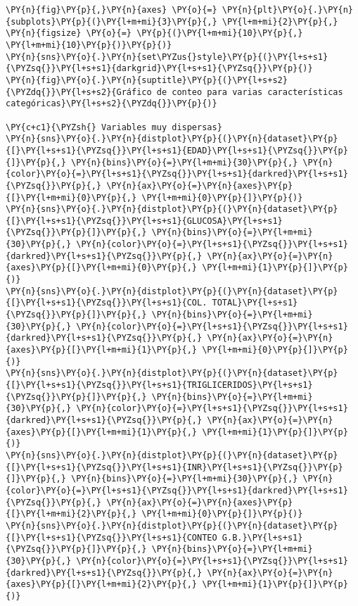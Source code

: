     \begin{tcolorbox}[breakable, size=fbox, boxrule=1pt, pad at break*=1mm,colback=cellbackground, colframe=cellborder]
\begin{Verbatim}[commandchars=\\\{\}]
\PY{n}{fig}\PY{p}{,}\PY{n}{axes} \PY{o}{=} \PY{n}{plt}\PY{o}{.}\PY{n}{subplots}\PY{p}{(}\PY{l+m+mi}{3}\PY{p}{,} \PY{l+m+mi}{2}\PY{p}{,} \PY{n}{figsize} \PY{o}{=} \PY{p}{(}\PY{l+m+mi}{10}\PY{p}{,} \PY{l+m+mi}{10}\PY{p}{)}\PY{p}{)}
\PY{n}{sns}\PY{o}{.}\PY{n}{set\PYZus{}style}\PY{p}{(}\PY{l+s+s1}{\PYZsq{}}\PY{l+s+s1}{darkgrid}\PY{l+s+s1}{\PYZsq{}}\PY{p}{)}
\PY{n}{fig}\PY{o}{.}\PY{n}{suptitle}\PY{p}{(}\PY{l+s+s2}{\PYZdq{}}\PY{l+s+s2}{Gráfico de conteo para varias características categóricas}\PY{l+s+s2}{\PYZdq{}}\PY{p}{)}

\PY{c+c1}{\PYZsh{} Variables muy dispersas}
\PY{n}{sns}\PY{o}{.}\PY{n}{distplot}\PY{p}{(}\PY{n}{dataset}\PY{p}{[}\PY{l+s+s1}{\PYZsq{}}\PY{l+s+s1}{EDAD}\PY{l+s+s1}{\PYZsq{}}\PY{p}{]}\PY{p}{,} \PY{n}{bins}\PY{o}{=}\PY{l+m+mi}{30}\PY{p}{,} \PY{n}{color}\PY{o}{=}\PY{l+s+s1}{\PYZsq{}}\PY{l+s+s1}{darkred}\PY{l+s+s1}{\PYZsq{}}\PY{p}{,} \PY{n}{ax}\PY{o}{=}\PY{n}{axes}\PY{p}{[}\PY{l+m+mi}{0}\PY{p}{,} \PY{l+m+mi}{0}\PY{p}{]}\PY{p}{)}
\PY{n}{sns}\PY{o}{.}\PY{n}{distplot}\PY{p}{(}\PY{n}{dataset}\PY{p}{[}\PY{l+s+s1}{\PYZsq{}}\PY{l+s+s1}{GLUCOSA}\PY{l+s+s1}{\PYZsq{}}\PY{p}{]}\PY{p}{,} \PY{n}{bins}\PY{o}{=}\PY{l+m+mi}{30}\PY{p}{,} \PY{n}{color}\PY{o}{=}\PY{l+s+s1}{\PYZsq{}}\PY{l+s+s1}{darkred}\PY{l+s+s1}{\PYZsq{}}\PY{p}{,} \PY{n}{ax}\PY{o}{=}\PY{n}{axes}\PY{p}{[}\PY{l+m+mi}{0}\PY{p}{,} \PY{l+m+mi}{1}\PY{p}{]}\PY{p}{)}
\PY{n}{sns}\PY{o}{.}\PY{n}{distplot}\PY{p}{(}\PY{n}{dataset}\PY{p}{[}\PY{l+s+s1}{\PYZsq{}}\PY{l+s+s1}{COL. TOTAL}\PY{l+s+s1}{\PYZsq{}}\PY{p}{]}\PY{p}{,} \PY{n}{bins}\PY{o}{=}\PY{l+m+mi}{30}\PY{p}{,} \PY{n}{color}\PY{o}{=}\PY{l+s+s1}{\PYZsq{}}\PY{l+s+s1}{darkred}\PY{l+s+s1}{\PYZsq{}}\PY{p}{,} \PY{n}{ax}\PY{o}{=}\PY{n}{axes}\PY{p}{[}\PY{l+m+mi}{1}\PY{p}{,} \PY{l+m+mi}{0}\PY{p}{]}\PY{p}{)}
\PY{n}{sns}\PY{o}{.}\PY{n}{distplot}\PY{p}{(}\PY{n}{dataset}\PY{p}{[}\PY{l+s+s1}{\PYZsq{}}\PY{l+s+s1}{TRIGLICERIDOS}\PY{l+s+s1}{\PYZsq{}}\PY{p}{]}\PY{p}{,} \PY{n}{bins}\PY{o}{=}\PY{l+m+mi}{30}\PY{p}{,} \PY{n}{color}\PY{o}{=}\PY{l+s+s1}{\PYZsq{}}\PY{l+s+s1}{darkred}\PY{l+s+s1}{\PYZsq{}}\PY{p}{,} \PY{n}{ax}\PY{o}{=}\PY{n}{axes}\PY{p}{[}\PY{l+m+mi}{1}\PY{p}{,} \PY{l+m+mi}{1}\PY{p}{]}\PY{p}{)}
\PY{n}{sns}\PY{o}{.}\PY{n}{distplot}\PY{p}{(}\PY{n}{dataset}\PY{p}{[}\PY{l+s+s1}{\PYZsq{}}\PY{l+s+s1}{INR}\PY{l+s+s1}{\PYZsq{}}\PY{p}{]}\PY{p}{,} \PY{n}{bins}\PY{o}{=}\PY{l+m+mi}{30}\PY{p}{,} \PY{n}{color}\PY{o}{=}\PY{l+s+s1}{\PYZsq{}}\PY{l+s+s1}{darkred}\PY{l+s+s1}{\PYZsq{}}\PY{p}{,} \PY{n}{ax}\PY{o}{=}\PY{n}{axes}\PY{p}{[}\PY{l+m+mi}{2}\PY{p}{,} \PY{l+m+mi}{0}\PY{p}{]}\PY{p}{)}
\PY{n}{sns}\PY{o}{.}\PY{n}{distplot}\PY{p}{(}\PY{n}{dataset}\PY{p}{[}\PY{l+s+s1}{\PYZsq{}}\PY{l+s+s1}{CONTEO G.B.}\PY{l+s+s1}{\PYZsq{}}\PY{p}{]}\PY{p}{,} \PY{n}{bins}\PY{o}{=}\PY{l+m+mi}{30}\PY{p}{,} \PY{n}{color}\PY{o}{=}\PY{l+s+s1}{\PYZsq{}}\PY{l+s+s1}{darkred}\PY{l+s+s1}{\PYZsq{}}\PY{p}{,} \PY{n}{ax}\PY{o}{=}\PY{n}{axes}\PY{p}{[}\PY{l+m+mi}{2}\PY{p}{,} \PY{l+m+mi}{1}\PY{p}{]}\PY{p}{)}


\end{Verbatim}
\end{tcolorbox}
